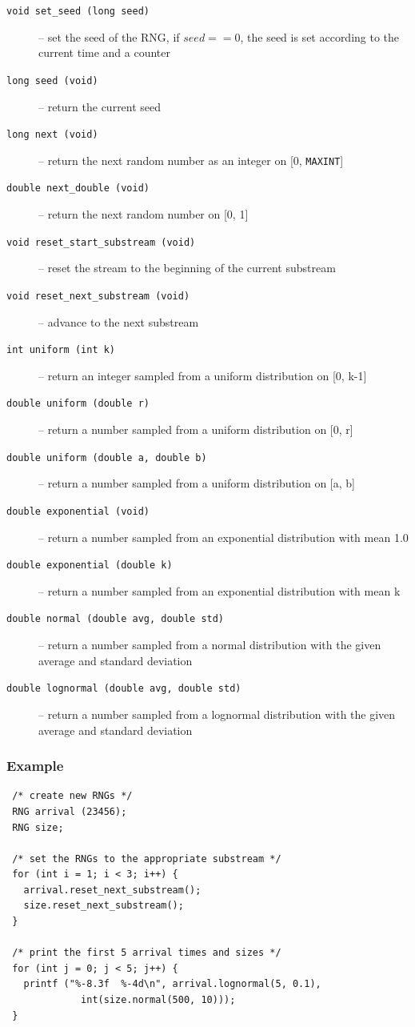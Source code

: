 \begin{description}
    \item[{\tt void set\_seed (long seed)}] -- set the seed of the RNG, if
    $seed == 0$, the seed is set according to the current time and a
    counter
    \item[{\tt long seed (void)}] -- return the current seed
    \item[{\tt long next (void)}] -- return the next random number as an
    integer on [0, {\tt MAXINT}]
    \item[{\tt double next\_double (void)}] -- return the next random number
    on [0, 1]
    \item[{\tt void reset\_start\_substream (void)}] -- reset the stream
    to the beginning of the current substream
    \item[{\tt void reset\_next\_substream (void)}] -- advance to the next
    substream
    \item[{\tt int uniform (int k)}] -- return an integer sampled from a
      uniform distribution on [0, k-1]
    \item[{\tt double uniform (double r)}] -- return a number sampled from a
      uniform distribution on [0, r]
    \item[{\tt double uniform (double a, double b)}] -- return a number
      sampled from a uniform distribution on [a, b]
    \item[{\tt double exponential (void)}] -- return a number sampled from an
    exponential distribution with mean 1.0
    \item[{\tt double exponential (double k)}] -- return a number sampled from
      an exponential distribution with mean k 
    \item[{\tt double normal (double avg, double std)}] -- return a number
      sampled from a normal distribution with the given average and standard 
    deviation
    \item[{\tt double lognormal (double avg, double std)}] -- return a number
      sampled from a lognormal distribution with the given average and
      standard deviation
\end{description}

\subsubsection{Example}

\begin{verbatim}
 /* create new RNGs */
 RNG arrival (23456);
 RNG size;

 /* set the RNGs to the appropriate substream */
 for (int i = 1; i < 3; i++) {
   arrival.reset_next_substream();
   size.reset_next_substream();
 }

 /* print the first 5 arrival times and sizes */
 for (int j = 0; j < 5; j++) {
   printf ("%-8.3f  %-4d\n", arrival.lognormal(5, 0.1),
             int(size.normal(500, 10)));
 }
\end{verbatim}

